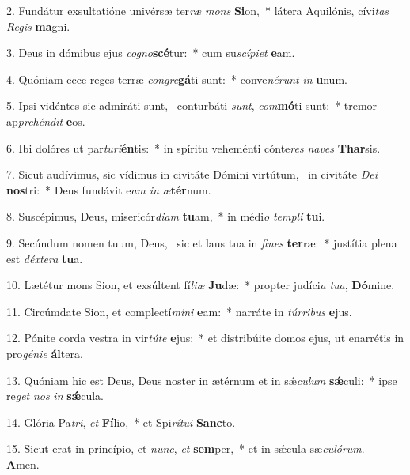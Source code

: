 2. Fundátur exsultatióne univérsæ ter\textit{ræ} \textit{mons} \textbf{Si}on,~*  látera Aquilónis, cívi\textit{tas} \textit{Re}\textit{gis} \textbf{ma}gni.\

3. Deus in dómibus ejus \textit{co}\textit{gno}\textbf{scé}tur:~*  cum su\textit{scí}\textit{pi}\textit{et} \textbf{e}am.\

4. Quóniam ecce reges terræ \textit{con}\textit{gre}\textbf{gá}ti sunt:~*  conve\textit{né}\textit{runt} \textit{in} \textbf{u}num.\

5. Ipsi vidéntes sic admiráti sunt, \dag\  conturbáti \textit{sunt}, \textit{com}\textbf{mó}ti sunt:~*  tremor ap\textit{pre}\textit{hén}\textit{dit} \textbf{e}os.\

6. Ibi dolóres ut par\textit{tu}\textit{ri}\textbf{én}tis:~*  in spíritu veheménti cónte\textit{res} \textit{na}\textit{ves} \textbf{Thar}sis.\

7. Sicut audívimus, sic vídimus in civitáte Dómini virtútum, \dag\  in civitáte \textit{De}\textit{i} \textbf{nos}tri:~*  Deus fundávit e\textit{am} \textit{in} \textit{æ}\textbf{tér}num.\

8. Suscépimus, Deus, misericór\textit{di}\textit{am} \textbf{tu}am,~*  in médi\textit{o} \textit{tem}\textit{pli} \textbf{tu}i.\

9. Secúndum nomen tuum, Deus, \dag\  sic et laus tua in \textit{fi}\textit{nes} \textbf{ter}ræ:~*  justítia plena est \textit{déx}\textit{te}\textit{ra} \textbf{tu}a.\

10. Lætétur mons Sion, et exsúltent fí\textit{li}\textit{æ} \textbf{Ju}dæ:~*  propter judíci\textit{a} \textit{tu}\textit{a}, \textbf{Dó}mine.\

11. Circúmdate Sion, et complectí\textit{mi}\textit{ni} \textbf{e}am:~*  narráte in \textit{túr}\textit{ri}\textit{bus} \textbf{e}jus.\

12. Pónite corda vestra in vir\textit{tú}\textit{te} \textbf{e}jus:~*  et distribúite domos ejus, ut enarrétis in pro\textit{gé}\textit{ni}\textit{e} \textbf{ál}tera.\

13. Quóniam hic est Deus, Deus noster in ætérnum et in sǽ\textit{cu}\textit{lum} \textbf{sǽ}culi:~*  ipse re\textit{get} \textit{nos} \textit{in} \textbf{sǽ}cula.\

14. Glória Pa\textit{tri}, \textit{et} \textbf{Fí}lio,~*  et Spi\textit{rí}\textit{tu}\textit{i} \textbf{Sanc}to.\

15. Sicut erat in princípio, et \textit{nunc}, \textit{et} \textbf{sem}per,~*  et in sǽcula sæ\textit{cu}\textit{ló}\textit{rum}. \textbf{A}men.\


